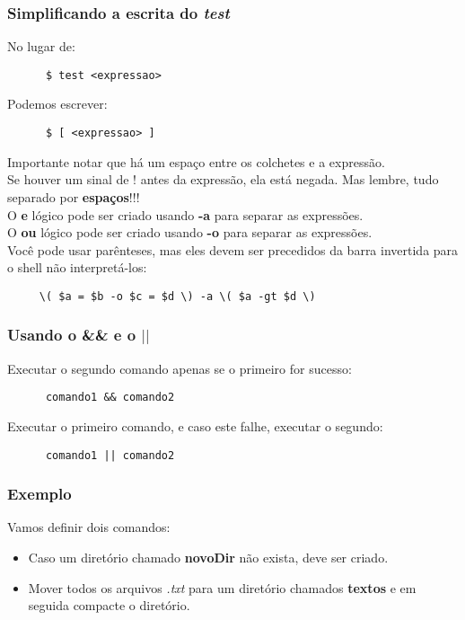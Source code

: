 \documentclass{beamer}
\begin{document}
   \begin{frame}[fragile]
      \frametitle{Simplificando a escrita do \textit{test}}
      No lugar de: 
      \begin{verbatim}
      $ test <expressao>
      \end{verbatim}
      Podemos escrever:
      \begin{verbatim}
      $ [ <expressao> ]
      \end{verbatim}
      Importante notar que há um espaço entre os colchetes e a expressão. \\
      Se houver um sinal de ! antes da expressão, ela está negada. Mas lembre, tudo separado por \textbf{espaços}!!! \\
      O \textbf{e} lógico pode ser criado usando \textbf{-a} para separar as expressões. \\
      O \textbf{ou} lógico pode ser criado usando \textbf{-o} para separar as expressões. \\
      Você pode usar parênteses, mas eles devem ser precedidos da barra invertida para o shell não interpretá-los: \\
      \begin{verbatim}
     \( $a = $b -o $c = $d \) -a \( $a -gt $d \)
     \end{verbatim}
\end{frame}

   \begin{frame}[fragile]
      \frametitle{Usando o \&\& e o $||$}
      Executar o segundo comando apenas se o primeiro for sucesso: 
      \begin{verbatim}
      comando1 && comando2
      \end{verbatim}
      Executar o primeiro comando, e caso este falhe, executar o segundo: 
      \begin{verbatim}
      comando1 || comando2
      \end{verbatim}
\end{frame}

   \begin{frame}
      \frametitle{Exemplo}
      Vamos definir dois comandos:
      \begin{itemize}
         \item Caso um diretório chamado \textbf{novoDir} não exista, deve ser criado.
	 \item Mover todos os arquivos \textit{.txt} para um diretório chamados \textbf{textos} e em seguida compacte o diretório.
      \end{itemize}
   \end{frame}
\end{document}
